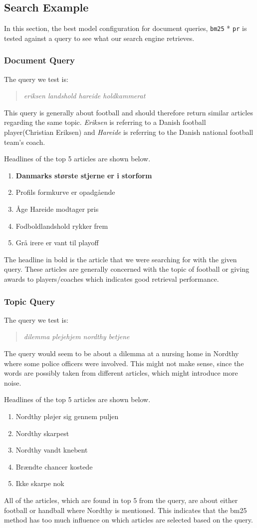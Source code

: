 \subsection{Search Example}
In this section, the best model configuration for document queries, \texttt{\gls{bm25}} * \texttt{\gls{pr}} is tested against a query to see what our search engine retrieves.


\subsubsection{Document Query}
The query we test is:
\begin{quotation}
	\textit{eriksen landshold hareide holdkammerat}
\end{quotation}
This query is generally about football and should therefore return similar articles regarding the same topic.
\textit{Eriksen} is referring to a Danish football player(Christian Eriksen) and \textit{Hareide} is referring to the Danish national football team's coach.


\noindent Headlines of the top 5 articles are shown below.
\begin{enumerate}
	\item \textbf{Danmarks største stjerne er i storform}
	\item Profils formkurve er opadgående
	\item Åge Hareide modtager pris
	\item Fodboldlandshold rykker frem
	\item Grå irere er vant til playoff
\end{enumerate}
The headline in bold is the article that we were searching for with the given query. 
These articles are generally concerned with the topic of football or giving awards to players/coaches which indicates good retrieval performance.


\subsubsection{Topic Query}
The query we test is:
\begin{quotation}
	\textit{dilemma plejehjem nordthy betjene}
\end{quotation}
The query would seem to be about a dilemma at a nursing home in Nordthy where some police officers were involved. 
This might not make sense, since the words are possibly taken from different articles, which might introduce more noise.

\noindent Headlines of the top 5 articles are shown below.
\begin{enumerate}
	\item Nordthy pløjer sig gennem puljen
	\item Nordthy skarpest
	\item Nordthy vandt knebent
	\item Brændte chancer kostede
	\item Ikke skarpe nok
\end{enumerate}
All of the articles, which are found in top 5 from the query, are about either football or handball where Nordthy is mentioned.
This indicates that the \gls{bm25} method has too much influence on which articles are selected based on the query.
